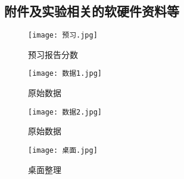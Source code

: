 \documentclass[dvipsnames, svgnames,a4paper,11pt]{article}
\begin{document}
	\subsection{附件及实验相关的软硬件资料等}
\begin{figure}[H]
	\begin{minipage}[b]{0.3\linewidth}
	  \centering
	  \texttt{[image: 预习.jpg]}	

	  \caption{预习报告分数}
	\end{minipage}
	\hfill
	\begin{minipage}[b]{0.3\linewidth}
	  \centering
	  \texttt{[image: 数据1.jpg]}
	  \caption{原始数据}
	\end{minipage}
	\hfill
	\begin{minipage}[b]{0.3\linewidth}
	  \centering
	  \texttt{[image: 数据2.jpg]}
	  \caption{原始数据}
	\end{minipage}
\end{figure}
\begin{figure}[{H}]
	\centering
	\texttt{[image: 桌面.jpg]}
	\caption{桌面整理}
	\label{}
\end{figure}
	
	
\end{document}
